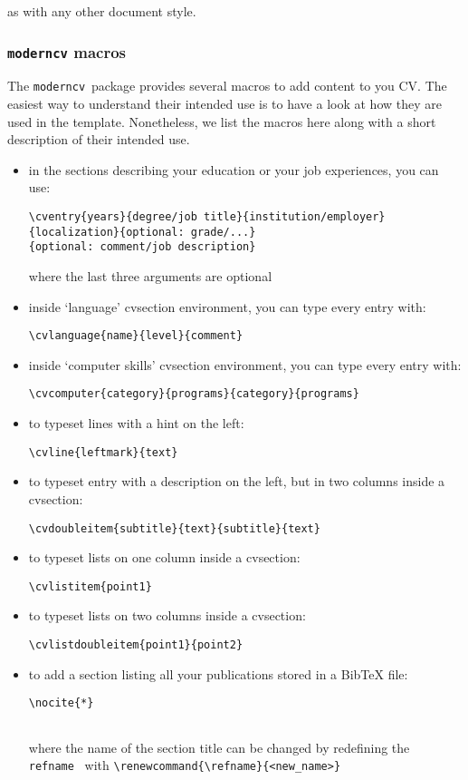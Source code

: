 \documentclass[a4paper,11pt]{article}
\newcommand{\Code}[1]{\lstinline!#1!~} %
\newcommand{\Moderncv}{\Code{moderncv}}
\begin{document}
as with any other document style.

\subsubsection{\texttt{moderncv} macros}

The \Moderncv package provides several macros to add content to you CV. The easiest way to understand their intended use is to have a look at how they are used in the template. 
Nonetheless, we list the macros here along with a short description of their intended use. 

\begin{itemize}
 \item in the sections describing your education or your job experiences, you can use:
 \begin{lstlisting}
\cventry{years}{degree/job title}{institution/employer}
{localization}{optional: grade/...}
{optional: comment/job description}
  \end{lstlisting} 

where the last three arguments are optional
 \item inside `language' cvsection environment, you can type every entry with:
 \begin{lstlisting}
\cvlanguage{name}{level}{comment}
 \end{lstlisting}
 \item inside `computer skills' cvsection environment, you can type every entry with:
 \begin{lstlisting}
\cvcomputer{category}{programs}{category}{programs}
 \end{lstlisting}
 \item to typeset lines with a hint on the left:
 \begin{lstlisting}
\cvline{leftmark}{text}
 \end{lstlisting}
 \item to typeset entry with a description on the left, but in two columns inside a cvsection:
 \begin{lstlisting}
\cvdoubleitem{subtitle}{text}{subtitle}{text}
 \end{lstlisting}
 \item to typeset lists on one column inside a cvsection:
 \begin{lstlisting}
\cvlistitem{point1}
 \end{lstlisting}
 \item to typeset lists on two columns inside a cvsection:
 \begin{lstlisting}
\cvlistdoubleitem{point1}{point2}
 \end{lstlisting}
 \item to add a section listing all your publications stored in a BibTeX file:
 \begin{lstlisting}
\nocite{*}


 \end{lstlisting}

 where the name of the section title can be changed by redefining the \Code{refname} with  \verb|\renewcommand{\refname}{<new_name>}|
\end{itemize}
\end{document}
